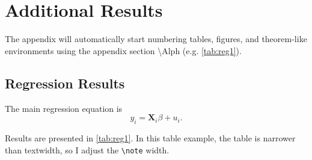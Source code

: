 \documentclass[12pt]{article}
\begin{document}
\newpage~\printbibliography

\newpage~\appendix

\section{Additional Results}

The appendix will automatically start numbering tables, figures, and theorem-like environments using the appendix section \textbackslash Alph (e.g. \autoref{tab:reg1}).

\citet{mas1995microeconomic} 

\subsection{Regression Results}

The main regression equation is 
\begin{equation}
  y_i = \mathbf{X}_i \beta + u_i.
\end{equation}

Results are presented in \autoref{tab:reg1}. In this table example, the table is narrower than textwidth, so I adjust the \texttt{\textbackslash note} width. 
\end{document}
